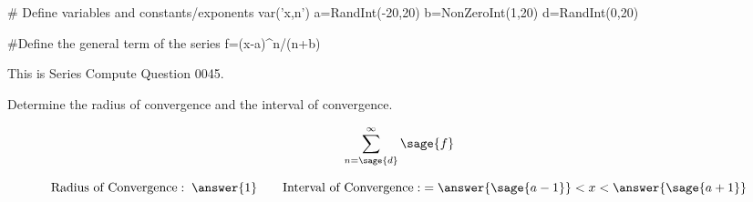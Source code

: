 \documentclass{ximera}
\renewcommand{\latexProblemContent}[1]{#1}
\begin{document}
\begin{sagesilent}
# Define variables and constants/exponents
var('x,n')
a=RandInt(-20,20)
b=NonZeroInt(1,20)
d=RandInt(0,20)

#Define the general term of the series
f=(x-a)^n/(n+b)

\end{sagesilent}

\latexProblemContent{
\ifVerboseLocation This is Series Compute Question 0045. \\ \fi
\begin{problem}
Determine the radius of convergence and the interval of convergence. 

\[\sum_{n=\sage{d}}^\infty \sage{f}\]



\[\mbox{Radius of Convergence}:\; \answer{1}\qquad \mbox{Interval of Convergence}:\; = \answer{\sage{a-1}}<x<\answer{\sage{a+1}}\]

\end{problem}}%

%
%
%
%
%
%
%
%
\end{document}
